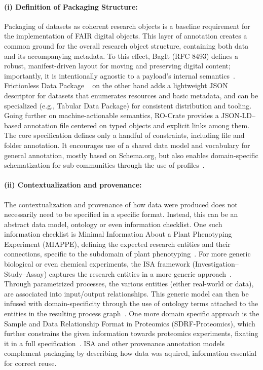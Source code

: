 \documentclass{jib}
\begin{document}
\paragraph{(i) Definition of Packaging Structure:}
Packaging of datasets as coherent research objects is a baseline requirement for the implementation of FAIR digital objects. This layer of annotation creates a common ground for the overall research object structure, containing both data and its accompanying metadata. 
To this effect, BagIt (RFC 8493) defines a robust, manifest-driven layout for moving and preserving digital content; importantly, it is intentionally agnostic to a payload’s internal semantics~\cite{rfc8493}. Frictionless Data Package ~\cite{fowler2017frictionless} on the other hand adds a lightweight JSON descriptor for datasets that enumerates resources and basic metadata, and can be specialized (e.g., Tabular Data Package) for consistent distribution and tooling. Going further on machine-actionable semantics, RO‑Crate provides a JSON‑LD–based annotation file centered on typed objects and explicit links among them. The core specification defines only a handful of constraints, including file and folder annotation. It encourages use of a shared data model and vocabulary for general annotation, mostly based on Schema.org, but also enables domain-specific schematization for sub-communities through the use of profiles~\cite{soilandreyes2022rocrate}. 

\paragraph{(ii) Contextualization and provenance:}
The contextualization and provenance of how data were produced does not necessarily need to be specified in a specific format. Instead, this can be an abstract data model, ontology or even information checklist. One such information checklist is Minimal Information About a Plant Phenotyping Experiment (MIAPPE), defining the expected research entities and their connections, specific to the subdomain of plant phenotyping~\cite{papoutsoglou2020miappe}.
For more generic biological or even chemical experiments, the ISA framework (Investigation–Study–Assay) captures the research entities in a more generic approach~\cite{roccaserra2012isa}. Through parametrized processes, the various entities (either real-world or data), are associated into input/output relationships. This generic model can then be infused with domain-specificity through the use of ontology terms attached to the entities in the resulting process graph~\cite{roccaserra2012isa,johnson2021isaapi}. One more domain specific approach is the Sample and Data Relationship Format in Proteomics (SDRF-Proteomics), which further constrains the given information towards proteomics experiments, fixating it in a full specification~\cite{perezriverol2020sdrf}. ISA and other provenance annotation models complement packaging by describing how data was aquired, information essential for correct reuse. 
\end{document}
